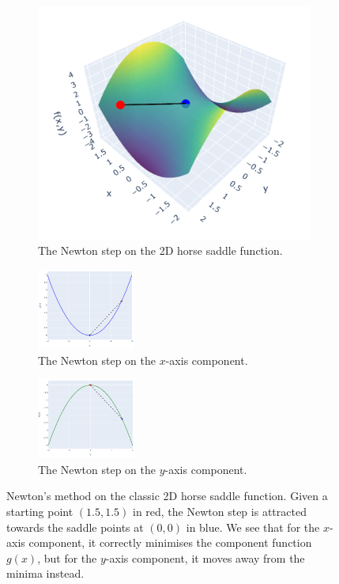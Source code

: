 \begin{figure}[h]
    \begin{subfigure}[b]{0.33\linewidth}
        \centering
        \includegraphics[width=\linewidth]{figures/2background/attract1.png}
        \caption{The Newton step on the 2D horse saddle function.}
        \label{fig:2d_attract}
    \end{subfigure}
    \hfill
    \begin{subfigure}[b]{0.32\linewidth}
        \centering
        \includegraphics[width=\linewidth, height=100px]{figures/2background/attract2.png}
        \caption{The Newton step on the $x$-axis component.}
        \label{fig:x_attract}
    \end{subfigure}
    \hfill
    \begin{subfigure}[b]{0.33\linewidth}
        \centering
        \includegraphics[width=\linewidth, height=100px]{figures/2background/attract3.png}
        \caption{The Newton step on the $y$-axis component.}
        \label{fig:y_attract}
    \end{subfigure}
    \caption{Newton's method on the classic 2D horse saddle function. Given a starting point $(1.5, 1.5)$ in red, the Newton step is attracted towards the saddle points at $(0, 0)$ in blue. We see that for the $x$-axis component, it correctly minimises the component function $g(x)$, but for the $y$-axis component, it moves away from the minima instead.}
    \label{fig:newton_attract}
\end{figure}

